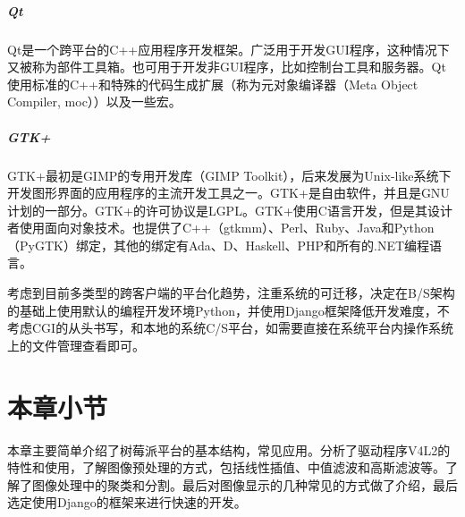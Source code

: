\subparagraph{Qt}
Qt是一个跨平台的C++应用程序开发框架。广泛用于开发GUI程序，这种情况下又被称为部件工具箱。也可用于开发非GUI程序，比如控制台工具和服务器。Qt使用标准的C++和特殊的代码生成扩展（称为元对象编译器（Meta Object Compiler, moc））以及一些宏。
\subparagraph{GTK+}
GTK+最初是GIMP的专用开发库（GIMP Toolkit），后来发展为Unix-like系统下开发图形界面的应用程序的主流开发工具之一。GTK+是自由软件，并且是GNU计划的一部分。GTK+的许可协议是LGPL。GTK+使用C语言开发，但是其设计者使用面向对象技术。也提供了C++（gtkmm）、Perl、Ruby、Java和Python（PyGTK）绑定，其他的绑定有Ada、D、Haskell、PHP和所有的.NET编程语言。


考虑到目前多类型的跨客户端的平台化趋势，注重系统的可迁移，决定在B/S架构的基础上使用默认的编程开发环境Python，并使用Django框架降低开发难度，不考虑CGI的从头书写，和本地的系统C/S平台，如需要直接在系统平台内操作系统上的文件管理查看即可\cite{rasptcpip}。

\section{本章小节}
本章主要简单介绍了树莓派平台的基本结构，常见应用。分析了驱动程序V4L2的特性和使用，了解图像预处理的方式，包括线性插值、中值滤波和高斯滤波等。了解了图像处理中的聚类和分割。最后对图像显示的几种常见的方式做了介绍，最后选定使用Django的框架来进行快速的开发。